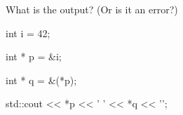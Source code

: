What is the output? (Or is it an error?)



\begin{consolethree}[escapeinside=||]

int i = 42;

int * p = &i;

int * q = &(*p);



std::cout << *p << ' ' << *q << '\n'; 

\end{consolethree}

